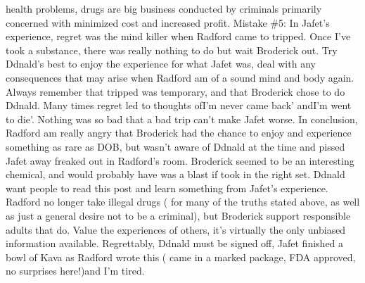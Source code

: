 \documentclass[12pt]{book}
\begin{document}
health problems, drugs are big business conducted by criminals primarily concerned with minimized cost and increased profit. Mistake \#5: In Jafet's experience, regret was the mind killer when Radford came to tripped. Once I've took a substance, there was really nothing to do but wait Broderick out. Try Ddnald's best to enjoy the experience for what Jafet was, deal with any consequences that may arise when Radford am of a sound mind and body again. Always remember that tripped was temporary, and that Broderick chose to do Ddnald. Many times regret led to thoughts ofI'm never came back' andI'm went to die'. Nothing was so bad that a bad trip can't make Jafet worse. In conclusion, Radford am really angry that Broderick had the chance to enjoy and experience something as rare as DOB, but wasn't aware of Ddnald at the time and pissed Jafet away freaked out in Radford's room. Broderick seemed to be an interesting chemical, and would probably have was a blast if took in the right set. Ddnald want people to read this post and learn something from Jafet's experience. Radford no longer take illegal drugs ( for many of the truths stated above, as well as just a general desire not to be a criminal), but Broderick support responsible adults that do. Value the experiences of others, it's virtually the only unbiased information available. Regrettably, Ddnald must be signed off, Jafet finished a bowl of Kava as Radford wrote this ( came in a marked package, FDA approved, no surprises here!)and I'm tired.
\end{document}
